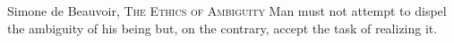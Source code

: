 \thispagestyle{empty}


\vspace*{5cm}

\medskip

\begin{chapquote}{Simone de Beauvoir, \textsc{The Ethics of Ambiguity}}
\noindent
Man must not attempt to dispel the ambiguity of his being but, on the contrary, accept the task of realizing it.
\end{chapquote}